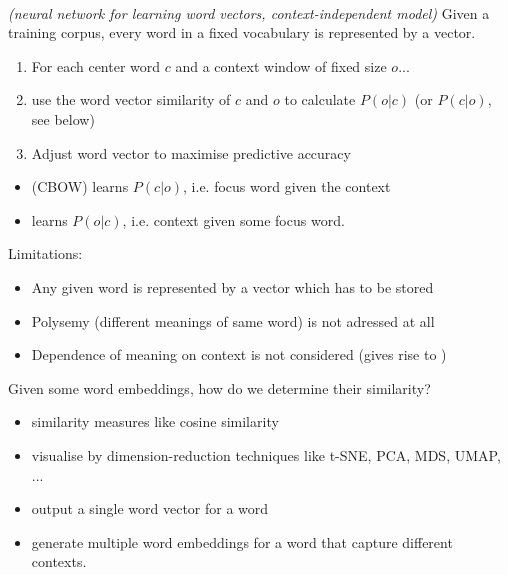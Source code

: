 \documentclass[10pt,twocolumn]{article}
\begin{document}
\paragraph{} \textit{(neural network for learning word vectors,
  context-independent model)}
Given a training corpus, every word in a fixed vocabulary is represented by a vector.
\begin{enumerate}
\item For each center word $c$ and a context window of fixed size $o$...
\item use the word vector similarity of $c$ and $o$ to calculate $P(o|c)$ (or
  $P(c|o)$, see below)
\item Adjust word vector to maximise predictive accuracy
\end{enumerate}
\begin{itemize}
\item {} (CBOW) learns $P(c|o)$, i.e. focus word given
  the context
\item {} learns $P(o|c)$, i.e. context given some focus word.
\end{itemize}
Limitations:
\begin{itemize}
\item Any given word is represented by a vector which has to be stored
\item Polysemy (different meanings of same word) is not adressed at all
\item Dependence of meaning on context is not considered (gives rise to
  )
\end{itemize}

Given some word embeddings, how do we determine their similarity?
\begin{itemize}
\item similarity measures like cosine similarity
\item visualise by dimension-reduction techniques like t-SNE, PCA, MDS, UMAP,
  ...
\end{itemize}

\begin{itemize}
\item {} output a single word vector for a word
\item {} generate multiple word embeddings for a
  word that capture different contexts.
\end{itemize}
\end{document}
